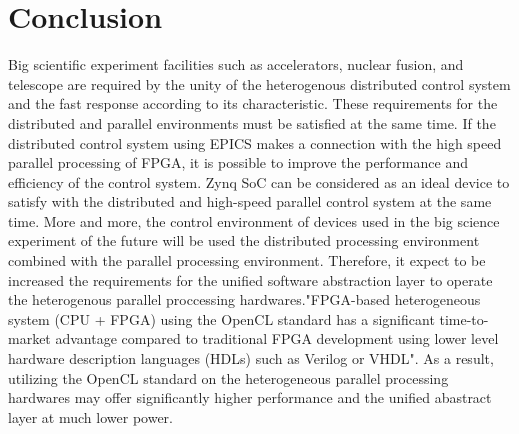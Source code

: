 \documentclass[journal,reqno]{IEEEtran}
\begin{document}
\section{Conclusion}
Big scientific experiment facilities such as accelerators, nuclear fusion, and telescope are  required by the unity of the heterogenous distributed control system and the fast response  according to its characteristic. These requirements for the distributed and parallel environments must be satisfied at the same time. If the distributed control system using EPICS makes a connection with the high speed parallel processing of FPGA, it is possible to improve the performance and efficiency of the control system. Zynq SoC can be considered as an ideal device to satisfy with the distributed and high-speed parallel control system at the same time. More and more, the control environment of devices used in the big science experiment of the future will be used the distributed processing environment combined with the parallel processing environment. Therefore, it expect to be increased the requirements for the unified software abstraction layer to operate the heterogenous parallel proccessing hardwares."FPGA-based heterogeneous system (CPU + FPGA) using the OpenCL standard has a significant time-to-market advantage compared to traditional FPGA development using lower level hardware description languages (HDLs) such as Verilog or VHDL"\cite{opencl_on_altera}.  As a result, utilizing the OpenCL standard on the heterogeneous parallel processing hardwares may offer significantly higher performance and the unified abastract layer at much lower power. 
\end{document}
